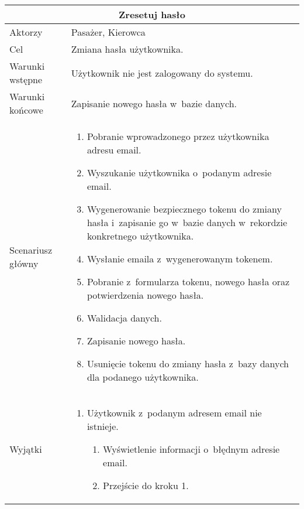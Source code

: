 \documentclass[eng,archivemode]{mgr}
\begin{document}
\newline
\vspace*{1 cm}
\newline
\begin{tabularx}{1\linewidth}{l|l}
	\multicolumn{2}{c}{\textbf{Zresetuj hasło}} \\ \hline
	Aktorzy & Pasażer, Kierowca\\ \hline
	Cel &  Zmiana hasła użytkownika. \\ \hline
	Warunki wstępne & Użytkownik nie jest zalogowany do systemu.\\ \hline
	Warunki końcowe & Zapisanie nowego hasła w~bazie danych.\\ \hline
	Scenariusz główny & 
	\begin{minipage}{4in}
		\vskip 4pt
		\begin{enumerate}
			\item Pobranie wprowadzonego przez użytkownika adresu email.
			\item Wyszukanie użytkownika o~podanym adresie email.
			\item Wygenerowanie bezpiecznego tokenu do zmiany hasła i~zapisanie go w~bazie danych w~rekordzie konkretnego użytkownika.
			\item Wysłanie emaila z~wygenerowanym tokenem.
			\item Pobranie z~formularza tokenu, nowego hasła oraz potwierdzenia nowego hasła.
			\item Walidacja danych.
			\item Zapisanie nowego hasła.
			\item Usunięcie tokenu do zmiany hasła z~bazy danych dla podanego użytkownika.
		\end{enumerate}
		\vskip 4pt
	\end{minipage}
	\\ \hline
	Wyjątki & 
	\begin{minipage}{4in}
		\vskip 4pt
		\begin{enumerate}[label={2.\Alph*.},leftmargin=1.2cm]
			\item Użytkownik z~podanym adresem email nie istnieje.
			\begin{enumerate}[label=2.A.\arabic*.]
				\item Wyświetlenie informacji o~błędnym adresie email.
				\item Przejście do kroku 1.
			\end{enumerate}
		\end{enumerate}
		\begin{enumerate}[label={6.\Alph*.},leftmargin=1.2cm]

\end{enumerate}
\end{minipage}
\end{tabularx}
\end{document}
